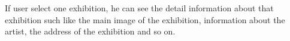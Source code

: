 \documentclass[conference]{IEEEtran}
\begin{document}
If user select one exhibition, he can see the detail information about that exhibition such like the main image of the exhibition, information about the artist, the address of the exhibition and so on. \\\\\\\\\\\\\\\\\\\\\\\\\\\\\\\\\\\\\\\\\\
\end{document}
